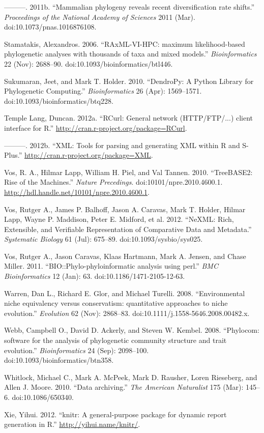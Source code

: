 \documentclass[author-year, 8pt, 3p]{elsarticle} %
\begin{document}
---------. 2011b. ``Mammalian phylogeny reveals recent diversification
rate shifts.'' \emph{Proceedings of the National Academy of Sciences}
2011 (Mar). doi:10.1073/pnas.1016876108.

Stamatakis, Alexandros. 2006. ``RAxML-VI-HPC: maximum likelihood-based
phylogenetic analyses with thousands of taxa and mixed models.''
\emph{Bioinformatics} 22 (Nov): 2688--90.
doi:10.1093/bioinformatics/btl446.

Sukumaran, Jeet, and Mark T. Holder. 2010. ``DendroPy: A Python Library
for Phylogenetic Computing.'' \emph{Bioinformatics} 26 (Apr):
1569--1571. doi:10.1093/bioinformatics/btq228.

Temple Lang, Duncan. 2012a. ``RCurl: General network (HTTP/FTP/...)
client interface for R.''
\href{http://cran.r-project.org/package=RCurl}{http://cran.r-project.org/package=RCurl}.

---------. 2012b. ``XML: Tools for parsing and generating XML within R
and S-Plus.''
\href{http://cran.r-project.org/package=XML}{http://cran.r-project.org/package=XML}.

Vos, R. A., Hilmar Lapp, William H. Piel, and Val Tannen. 2010.
``TreeBASE2: Rise of the Machines.'' \emph{Nature Precedings}.
doi:10101/npre.2010.4600.1.
\href{http://hdl.handle.net/10101/npre.2010.4600.1}{http://hdl.handle.net/10101/npre.2010.4600.1}.

Vos, Rutger A., James P. Balhoff, Jason A. Caravas, Mark T. Holder,
Hilmar Lapp, Wayne P. Maddison, Peter E. Midford, et al. 2012. ``NeXML:
Rich, Extensible, and Verifiable Representation of Comparative Data and
Metadata.'' \emph{Systematic Biology} 61 (Jul): 675--89.
doi:10.1093/sysbio/sys025.

Vos, Rutger A., Jason Caravas, Klaas Hartmann, Mark A. Jensen, and Chase
Miller. 2011. ``BIO::Phylo-phyloinformatic analysis using perl.''
\emph{BMC Bioinformatics} 12 (Jan): 63. doi:10.1186/1471-2105-12-63.

Warren, Dan L., Richard E. Glor, and Michael Turelli. 2008.
``Environmental niche equivalency versus conservatism: quantitative
approaches to niche evolution.'' \emph{Evolution} 62 (Nov): 2868--83.
doi:10.1111/j.1558-5646.2008.00482.x.

Webb, Campbell O., David D. Ackerly, and Steven W. Kembel. 2008.
``Phylocom: software for the analysis of phylogenetic community
structure and trait evolution.'' \emph{Bioinformatics} 24 (Sep):
2098--100. doi:10.1093/bioinformatics/btn358.

Whitlock, Michael C., Mark A. McPeek, Mark D. Rausher, Loren Rieseberg,
and Allen J. Moore. 2010. ``Data archiving.'' \emph{The American
Naturalist} 175 (Mar): 145--6. doi:10.1086/650340.

Xie, Yihui. 2012. ``knitr: A general-purpose package for dynamic report
generation in R.''
\href{http://yihui.name/knitr/}{http://yihui.name/knitr/}.

%
\end{document}
